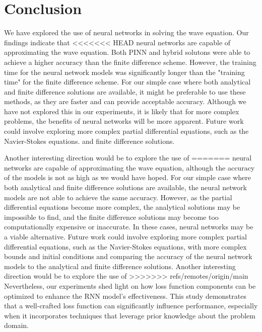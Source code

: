 \documentclass[twoside,11pt]{report}
\begin{document}
\section{Conclusion}
\label{sec:conclusion}

    We have explored the use of neural networks in solving the wave equation. Our findings indicate that
<<<<<<< HEAD
    neural networks are capable of approximating the wave equation.
    Both PINN and hybrid solutons were able to achieve a higher accuracy than the finite difference scheme.
    However, the training time for the neural network models was significantly longer than the "training time"
    for the finite difference scheme.
    For our simple case where both analytical and finite difference
    solutions are available, it might be preferable to use these methods, as they are faster and can provide
    acceptable accuracy. Although we have not explored this in our experiments, it is likely that for more complex
    problems, the benefits of neural networks will be more apparent.
    Future work could involve exploring more complex partial differential equations, such as the
    Navier-Stokes equations. 
    and finite difference solutions. 

    Another interesting direction would be to explore the use of
=======
    neural networks are capable of approximating the wave equation, although the accuracy of the models
    is not as high as we would have hoped. For our simple case where both analytical and finite difference
    solutions are available, the neural network models are not able to achieve the same accuracy. 
    However, as the partial differential equations become
    more complex, the analytical solutions may be impossible to find, and the finite difference solutions
    may become too computationally expensive or inaccurate. In these cases, neural networks may be a
    viable alternative.
    Future work could involve exploring more complex partial differential equations, such as the
    Navier-Stokes equations, with more complex bounds and initial conditions 
    and comparing the accuracy of the neural network models to the analytical
    and finite difference solutions. Another interesting direction would be to explore the use of
>>>>>>> refs/remotes/origin/main
    Nevertheless, our experiments shed light on how loss function components can be optimized 
    to enhance the RNN model's effectiveness. This study demonstrates that a well-crafted loss 
    function can significantly influence performance, especially when it incorporates techniques 
    that leverage prior knowledge about the problem domain.
    
\end{document}

